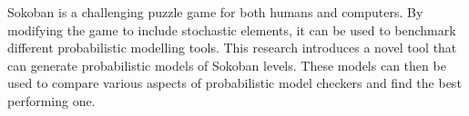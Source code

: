 Sokoban is a challenging puzzle game for both humans and computers. By modifying the game to include stochastic elements, it can be used to benchmark different probabilistic modelling tools. This research introduces a novel tool that can generate probabilistic models of Sokoban levels. These models can then be used to compare various aspects of probabilistic model checkers and find the best performing one.